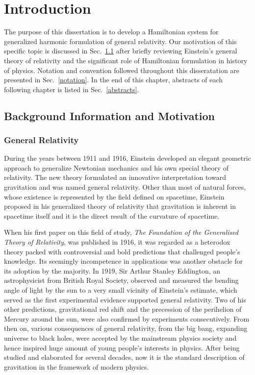 \chapter{Introduction}\label{introduction}
The purpose of this dissertation is to develop a Hamiltonian system for generalized harmonic formulation of general relativity. Our motivation of this specific topic is discussed in Sec.~\ref{background} after briefly reviewing Einstein's general theory of relativity and the significant role of Hamiltonian formulation in history of physics. Notation and convention followed throughout this disseratation are presented in Sec.~\ref{notation}. In the end of this chapter, abstracts of each following chapter is listed in Sec.~\ref{abstracts}.
\section{Background Information and Motivation}\label{background}
\subsection{General Relativity}\label{gr}
During the years between 1911 and 1916, Einstein developed an elegant geometric approach to generalize Newtonian mechanics and his own special theory of relativity. The new theory formulated an innovative interpretation toward gravitation and was named general relativity. Other than most of natural forces, whose existence is represented by the field defined on spacetime, Einstein proposed in his generalized theory of relativity that gravitation is inherent in spacetime itself and it is the direct result of the curvature of spacetime\cite{carroll2003spacetime}.

When his first paper on this field of study, {\it The Foundation of the Generalised Theory of Relativity}, was published in 1916, it was regarded as a heterodox theory packed with controversial and bold predictions that challenged people's knowledge. Its seemingly incompetence in applications was another obstacle for its adoption by the majority. In 1919, Sir Arthur Stanley Eddington, an astrophysicist from British Royal Society, observed and measured the bending angle of light by the sun to a very small vicinity of Einstein's estimate, which served as the first experimental evidence supported general relativity. Two of his other predictions, gravitational red shift and the precession of the perihelion of Mercury around the sun, were also confirmed by experiments consecutively. From then on, various consequences of general relativity, from the big bang, expanding universe to black holes, were accepted by the mainstream physics society and hence inspired huge amount of young people's interests in physics. After being studied and elaborated for several decades, now it is the standard description of gravitation in the framework of modern physics. 


